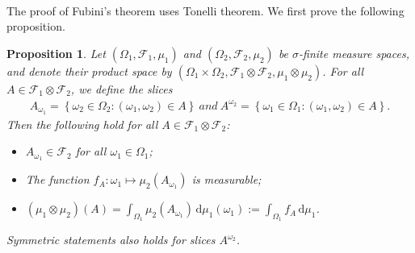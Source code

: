 \documentclass{article}
\numberwithin{equation}{section}
\renewcommand{\d}{\mathrm{d}}
\theoremstyle{plain}
\newtheorem{proposition}[theorem]{Proposition}
\theoremstyle{definition}
\begin{document}
\paragraph{} The proof of Fubini's theorem uses Tonelli theorem. We first prove the following proposition.

\begin{proposition}\label{prop:1.51} Let $(\Omega_1,\mathscr{F}_1,\mu_1)$ and $(\Omega_2,\mathscr{F}_2,\mu_2)$ be $\sigma$-finite measure spaces, and denote their product space by $(\Omega_1\times\Omega_2,\mathscr{F}_1\otimes\mathscr{F}_2,\mu_1\otimes\mu_2)$. For all $A\in\mathscr{F}_1\otimes\mathscr{F}_2$, we define the \textit{slices}
\begin{align*}
	A_{\omega_1} = \left\{\omega_2\in\Omega_2:(\omega_1,\omega_2)\in A\right\}\ \textit{and}\ A^{\omega_2} = \left\{\omega_1\in\Omega_1:(\omega_1,\omega_2)\in A\right\}.
\end{align*}
Then the following hold for all $A\in\mathscr{F}_1\otimes\mathscr{F}_2$:
\begin{itemize}
	\item[(i)] $A_{\omega_1}\in\mathscr{F}_2$ for all $\omega_1\in\Omega_1$;
	\item[(ii)] The function $f_A:\omega_1\mapsto\mu_2(A_{\omega_1})$ is measurable;
	\item[(iii)] $(\mu_1\otimes\mu_2)(A)=\int_{\Omega_1}\mu_2(A_{\omega_1})\,\d \mu_1(\omega_1):=\int_{\Omega_1} f_A\,\d \mu_1$.
\end{itemize}
Symmetric statements also holds for slices $A^{\omega_2}$.
\end{proposition}
\end{document}
